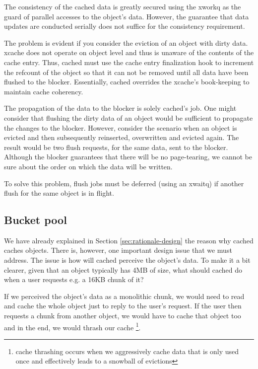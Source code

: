 The consistency of the cached data is greatly secured using the xworkq as the 
guard of parallel accesses to the object's data. However, the guarantee that 
data updates are conducted serially does not suffice for the consistency 
requirement.

The problem is evident if you consider the eviction of an object with dirty 
data. xcache does not operate on object level and thus is unaware of the 
contents of the cache entry. Thus, cached must use the cache entry finalization 
hook to increment the refcount of the object so that it can not be removed 
until all data have been flushed to the blocker. Essentially, cached overrides 
the xcache's book-keeping to maintain cache coherency.

The propagation of the data to the blocker is solely cached's job. One might 
consider that flushing the dirty data of an object would be sufficient to 
propagate the changes to the blocker. However, consider the scenario when an 
object is evicted and then subsequently reinserted, overwritten and evicted 
again. The result would be two flush requests, for the same data, sent to the 
blocker. Although the blocker guarantees that there will be no page-tearing, we 
cannot be sure about the order on which the data will be written.

To solve this problem, flush jobs must be deferred (using an xwaitq) if another 
flush for the same object is in flight. 

\subsection{Bucket pool}


We have already explained in Section \ref{sec:rationale-design} the reason why 
cached caches objects. There is, however, one important design issue that we 
must address. The issue is how will cached perceive the object's data. To make 
it a bit clearer, given that an object typically has 4MB of size, what should 
cached do when a user requests e.g. a 16KB chunk of it?

If we perceived the object's data as a monolithic chunk, we would need to read 
and cache the whole object just to reply to the user's request. If the user 
then requests a chunk from another object, we would have to cache that object 
too and in the end, we would thrash our cache
\footnote{
	cache thrashing occurs when we aggressively cache data that is only 
	used once and effectively leads to a snowball of evictions
}.

